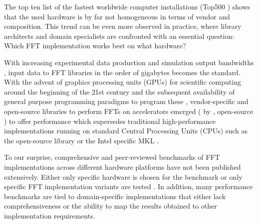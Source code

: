 The top ten list of the fastest worldwide computer installations (Top500 \citep{meuer2011top500}) shows that the used hardware is by far not homogeneous in terms of vendor and composition. This trend can be even more observed in practice, where library architects and domain specialists are confronted with an essential question: Which FFT implementation works best on what hardware?  

With increasing experimental data production \citep{huisken2004optical} and simulation output bandwidths \citep{maronga2015parallelized}, input data to FFT libraries in the order of gigabytes becomes the standard. With the advent of graphics processing units (GPUs) for scientific computing around the beginning of the 21st century and the subsequent availability of general purpose programming paradigms to program these \citep{du2012cuda}, vendor-specific and open-source libraries to perform FFTs on accelerators emerged (\cufft{} \citep{nvidia2010cufft} by \nvidia{}, open-source \clfft{} \citep{clfft}) to offer performance which supersedes traditional high-performance implementations running on standard Central Processing Units (CPUs) such as the open-source \fftw{} library \citep{FFTW05} or the Intel specific MKL \citep{intel2007intel}.


%
To our surprise, comprehensive and peer-reviewed benchmarks of FFT implementations across different hardware platforms have not been published extensively. Either only specific hardware is chosen for the benchmark \citep{park2015fast,eleftheriou2005performance,Akin:15} or only specific FFT implementation variants are tested \citep{shoc2010,dongarra2013hpc}. In addition, many performance benchmarks are tied to domain-specific implementations \citep{fialka2006fft} that either lack comprehensiveness or the ability to map the results obtained to other implementation requirements.


